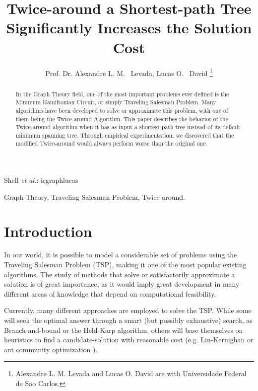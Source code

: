 \documentclass[journal]{IEEEtran}
\begin{document}
\title{Twice-around a Shortest-path Tree Significantly Increases the Solution Cost}

\author{Prof. Dr. Alexandre L. M. ~Levada,
	Lucas O. ~David
\thanks{Alexandre L. M. Levada and Lucas O. David are with Universidade Federal de Sao Carlos.}%
}

\markboth{\today}%
{Shell \MakeLowercase{\textit{et al.}}: icgraphlucas}

\maketitle

\begin{abstract}

In the Graph Theory field, one of the most important problems ever defined is the Minimum Hamiltonian Circuit, or simply Traveling Salesman Problem. Many algorithms have been developed to solve or approximate this problem, with one of them being the Twice-around Algorithm. This paper describes the behavior of the Twice-around algorithm when it has as input a shortest-path tree instead of its default minimum spanning tree. Through empirical experimentation, we discovered that the modified Twice-around would always perform worse than the original one.

\end{abstract}

\begin{IEEEkeywords}
	Graph Theory, Traveling Salesman Problem, Twice-around.
\end{IEEEkeywords}

\section{Introduction}

In our world, it is possible to model a considerable set of problems using the Traveling Salesman Problem (TSP), making it one of the most popular existing algorithms. The study of methods that solve or satisfactorily approximate a solution is of great importance, as it would imply great development in many different areas of knowledge that depend on computational feasibility.

Currently, many different approaches are employed to solve the TSP. While some will seek the optimal answer through a smart (but possibly exhaustive) search, as Branch-and-bound or the Held-Karp algorithm, others will base themselves on heuristics to find a candidate-solution with reasonable cost (e.g. Lin-Kernighan or ant community optimization \cite{soricone}).
\end{document}
